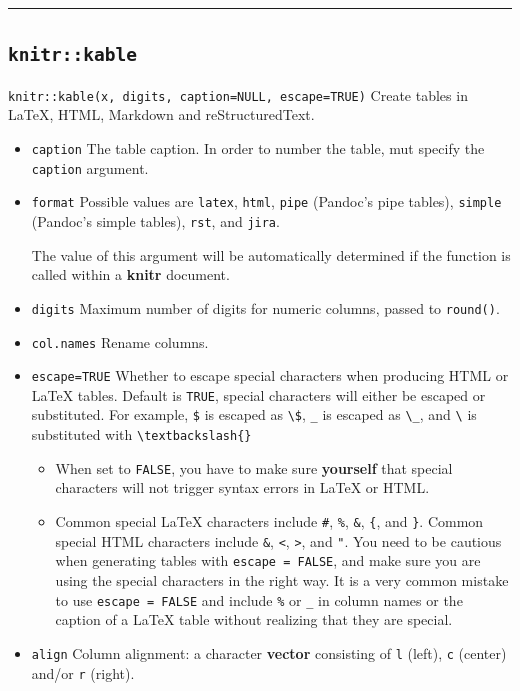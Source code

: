 \documentclass[
  a4paper,
  twoside,
  openright]{book}
\providecommand{\tightlist}{%
  \setlength{\itemsep}{0pt}\setlength{\parskip}{0pt}}
\theoremstyle{definition}
\theoremstyle{definition}
\theoremstyle{definition}
\theoremstyle{definition}
\theoremstyle{remark}
\begin{document}
\begin{center}\rule{0.5\linewidth}{0.5pt}\end{center}

\subsection{\texorpdfstring{\texttt{knitr::kable}}{knitr::kable}}\label{knitrkable}

\texttt{knitr::kable(x,\ digits,\ caption=NULL,\ escape=TRUE)} Create tables in LaTeX, HTML, Markdown and reStructuredText.

\begin{itemize}
\item
  \texttt{caption} The table caption. In order to number the table, mut specify the \texttt{caption} argument.
\item
  \texttt{format} Possible values are \texttt{latex}, \texttt{html}, \texttt{pipe} (Pandoc's pipe tables), \texttt{simple} (Pandoc's simple tables), \texttt{rst}, and \texttt{jira}.

  The value of this argument will be {automatically determined} if the function is called within a \textbf{knitr} document.
\item
  \texttt{digits} Maximum number of digits for numeric columns, passed to \texttt{round()}.
\item
  \texttt{col.names} Rename columns.
\item
  \texttt{escape=TRUE} Whether to escape special characters when producing HTML or LaTeX tables. Default is \texttt{TRUE}, special characters will either be escaped or substituted. For example, \texttt{\$} is escaped as \texttt{\textbackslash{}\$}, \texttt{\_} is escaped as \texttt{\textbackslash{}\_}, and \texttt{\textbackslash{}} is substituted with \texttt{\textbackslash{}textbackslash\{\}}

  \begin{itemize}
  \tightlist
  \item
    When set to \texttt{FALSE}, you have to make sure \textbf{yourself} that special characters will not trigger syntax errors in LaTeX or HTML.
  \item
    Common special LaTeX characters include \texttt{\#}, \texttt{\%}, \texttt{\&}, \texttt{\{}, and \texttt{\}}. Common special HTML characters include \texttt{\&}, \texttt{\textless{}}, \texttt{\textgreater{}}, and \texttt{"}. You need to be cautious when generating tables with \texttt{escape\ =\ FALSE}, and make sure you are using the special characters in the right way. It is a very common mistake to use \texttt{escape\ =\ FALSE} and include \texttt{\%} or \texttt{\_} in column names or the caption of a LaTeX table without realizing that they are special.
  \end{itemize}
\item
  \texttt{align} Column alignment: a character \textbf{vector} consisting of \texttt{\textquotesingle{}l\textquotesingle{}} (left), \texttt{\textquotesingle{}c\textquotesingle{}} (center) and/or \texttt{\textquotesingle{}r\textquotesingle{}} (right).


\end{itemize}
\end{document}
